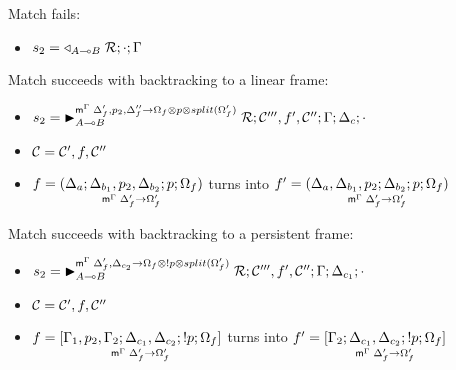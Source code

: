 
\item Match fails:
\begin{itemize}[leftmargin=\secondm]
   \item $s_2 = \contstate{A \lolli B}{\rulestk}{\cdot}{\Gamma}$
\end{itemize}

\item Match succeeds with backtracking to a linear frame:
\begin{itemize}[leftmargin=\secondm]
   \item $s_2 = \matstate{A \lolli B}{\rulestk}{\lstack{C'''}, f',
      \lstack{C''}}{\Gamma}{\Delta_c}{\cdot}{\Delta'_f, p_2, \Delta''_f \rightarrow
      \Omega_f \otimes p \otimes split(\Omega'_f)}$

   \item $\lstack{C} = \lstack{C'}, f, \lstack{C''}$

   \item $f = \lframe{\Delta_a}{\Delta_{b_1}, p_2, \Delta_{b_2}}{p}{\Omega_f}{\Delta_f'}{\Omega_f'}$
   turns into $f' = \lframe{\Delta_a, \Delta_{b_1},
      p_2}{\Delta_{b_2}}{p}{\Omega_f}{\Delta'_f}{\Omega'_f}$

\end{itemize}

\item Match succeeds with backtracking to a persistent frame:
\begin{itemize}[leftmargin=\secondm]
   \item $s_2 = \matstate{A \lolli B}{\rulestk}{\lstack{C'''}, f',
      \lstack{C''}}{\Gamma}{\Delta_{c_1}}{\cdot}{\Delta'_f, \Delta_{c_2}
         \rightarrow \Omega_f \otimes \bang p \otimes split(\Omega'_f)}$
   \item $\lstack{C} = \lstack{C'}, f, \lstack{C''}$

   \item $f = \pframe{\Gamma_1, p_2,
      \Gamma_2}{\Delta_{c_1}, \Delta_{c_2}}{\bang p}{\Omega_f}{\Delta'_f}{\Omega'_f}$
   turns into $f' = \pframe{\Gamma_2}{\Delta_{c_1},
      \Delta_{c_2}}{\bang p}{\Omega_f}{\Delta'_f}{\Omega'_f}$

\end{itemize}
